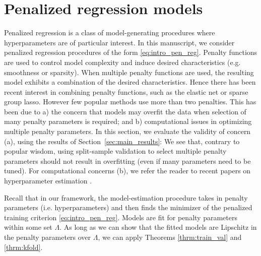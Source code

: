 \documentclass[12pt]{article}
\begin{document}

\section{Penalized regression models}
\label{sec:examples}

Penalized regression is a class of model-generating procedures where hyperparameters are of particular interest. In this manuscript, we consider penalized regression procedures of the form \eqref{eq:intro_pen_reg}. Penalty functions are used to control model complexity and induce desired characteristics (e.g. smoothness or sparsity). When multiple penalty functions are used, the resulting model exhibits a combination of the desired characteristics. Hence there has been recent interest in combining penalty functions, such as the elastic net or sparse group lasso. However few popular methods use more than two penalties. This has been due to a) the concern that models may overfit the data when selection of many penalty parameters is required; and b) computational issues in optimizing multiple penalty parameters. In this section, we evaluate the validity of concern (a), using the results of Section~\ref{sec:main_results}: We see that, contrary to popular wisdom, using split-sample validation to select multiple penalty parameters should not result in overfitting (even if many parameters need to be tuned). For computational concerns (b), we refer the reader to recent papers on hyperparameter estimation \citep{bengio2000gradient, foo2008efficient, snoek2012practical}.

Recall that in our framework, the model-estimation procedure takes in penalty parameters (i.e. hyperparameters) and then finds the minimizer of the penalized training criterion \eqref{eq:intro_pen_reg}. Models are fit for penalty parameters within some set $\Lambda$. As long as we can show that the fitted models are Lipschitz in the penalty parameters over $\Lambda$, we can apply Theorems \ref{thrm:train_val} and \ref{thrm:kfold}.
\end{document}
